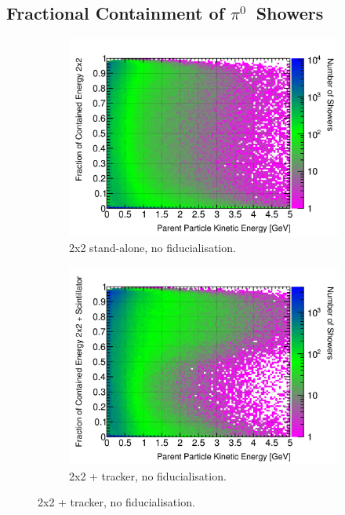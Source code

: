 \documentclass[10pt,a4paper,openany]{article}
\begin{document}
\subsection{Fractional Containment of $\pi^{0}$~Showers}
\begin{figure}[!htb]
	\centering
	\begin{subfigure}[b]{0.49\textwidth}
		\centering
		\includegraphics[width=1.0\textwidth]{Pi0_contained_frac_2x2.png}
		\caption{2x2 stand-alone, no fiducialisation.}
		\label{}
	\end{subfigure}	
	\hfill
	\begin{subfigure}[b]{0.49\textwidth}
		\centering
		\includegraphics[width=1.0\textwidth]{Pi0_contained_frac_2x2_Scintillator_gap.png}
		\caption{2x2 + tracker, no fiducialisation.}

\end{subfigure}
\end{figure}
\end{document}
